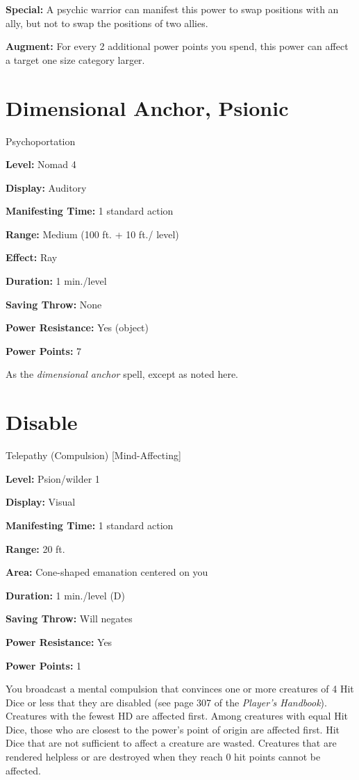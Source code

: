 \documentclass{article}
\begin{document}
\textbf{Special:} A psychic warrior can manifest this power to swap positions with 
an ally, but not to swap the positions of two allies.

\textbf{Augment:} For every 2 additional power points you spend, this power can 
affect a target one size category larger. 

\vspace{12pt}
\section*{Dimensional Anchor, Psionic}

Psychoportation

\textbf{Level:} Nomad 4

\textbf{Display:} Auditory

\textbf{Manifesting Time:} 1 standard action

\textbf{Range:} Medium (100 ft. + 10 ft./ level)

\textbf{Effect:} Ray

\textbf{Duration:} 1 min./level

\textbf{Saving Throw:} None

\textbf{Power Resistance:} Yes (object)

\textbf{Power Points:} 7

As the \textit{dimensional anchor }spell, except as noted here.

\vspace{12pt}
\section*{Disable}

Telepathy (Compulsion) [Mind-Affecting]

\textbf{Level:} Psion/wilder 1

\textbf{Display:} Visual

\textbf{Manifesting Time:} 1 standard action

\textbf{Range:} 20 ft.

\textbf{Area:} Cone-shaped emanation centered on you

\textbf{Duration:} 1 min./level (D)

\textbf{Saving Throw:} Will negates

\textbf{Power Resistance:} Yes

\textbf{Power Points:} 1

You broadcast a mental compulsion that convinces one or more creatures of 4 Hit 
Dice or less that they are disabled (see page 307 of the \textit{Player's Handbook}). 
Creatures with the fewest HD are affected first. Among creatures with equal Hit 
Dice, those who are closest to the power's point of origin are affected first. 
Hit Dice that are not sufficient to affect a creature are wasted. Creatures that 
are rendered helpless or are destroyed when they reach 0 hit points cannot be affected. 
\end{document}

